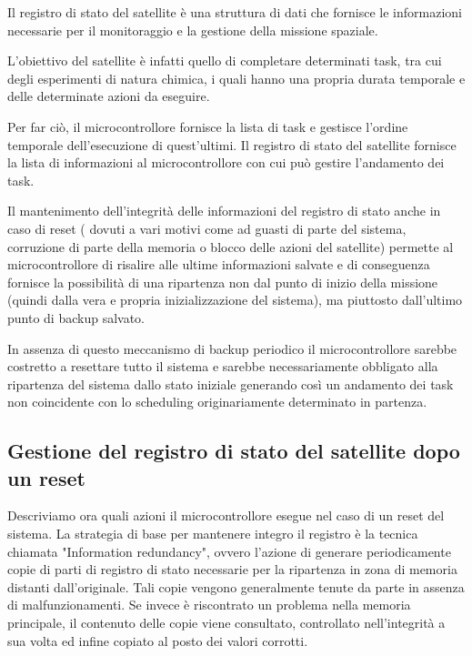 \documentclass[LaM,binding=0.6cm,oneside]{../sapthesis}
\begin{document}
Il registro di stato del satellite è una struttura di dati che fornisce le informazioni necessarie per il monitoraggio e la gestione della missione spaziale. 

L’obiettivo del satellite è infatti quello di completare determinati task, tra cui degli esperimenti di natura chimica, i quali hanno una propria durata temporale e delle determinate azioni da eseguire. 

Per far ciò, il microcontrollore fornisce la lista di task e gestisce l’ordine temporale dell’esecuzione di quest’ultimi.
Il registro di stato del satellite fornisce la lista di informazioni al microcontrollore con cui può gestire l’andamento dei task.

Il mantenimento dell’integrità delle informazioni del registro di stato anche in caso di reset ( dovuti a vari motivi come ad guasti di parte del sistema, corruzione di parte della memoria o blocco delle azioni del satellite) permette al microcontrollore di risalire alle ultime informazioni salvate e di conseguenza fornisce la possibilità di una ripartenza non dal punto di inizio della missione (quindi dalla vera e propria inizializzazione del sistema), ma piuttosto dall'ultimo punto di backup salvato. 

In assenza di questo meccanismo di backup periodico il microcontrollore sarebbe costretto a resettare tutto il sistema e sarebbe necessariamente obbligato alla ripartenza del sistema dallo stato iniziale generando così un andamento dei task non coincidente con lo scheduling originariamente determinato in partenza.



\subsection{Gestione del registro di stato del satellite dopo un reset
}
Descriviamo ora quali azioni il microcontrollore esegue nel caso di un reset del sistema.
La strategia di base per mantenere integro il registro è la tecnica chiamata "Information redundancy", ovvero l’azione di generare periodicamente copie di parti di registro di stato necessarie per la ripartenza in zona di memoria distanti dall’originale. 
\newline
Tali copie vengono generalmente tenute da parte in assenza di malfunzionamenti. Se invece è riscontrato un problema nella memoria principale, il contenuto delle copie viene consultato, controllato nell'integrità a sua volta ed infine copiato al posto dei valori corrotti.
\end{document}
